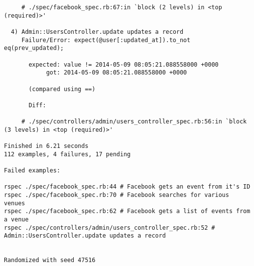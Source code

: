 \begin{lstlisting}
     # ./spec/facebook_spec.rb:67:in `block (2 levels) in <top (required)>'

  4) Admin::UsersController.update updates a record
     Failure/Error: expect(@user[:updated_at]).to_not eq(prev_updated);
       
       expected: value != 2014-05-09 08:05:21.088558000 +0000
            got: 2014-05-09 08:05:21.088558000 +0000
       
       (compared using ==)
       
       Diff:
       
     # ./spec/controllers/admin/users_controller_spec.rb:56:in `block (3 levels) in <top (required)>'

Finished in 6.21 seconds
112 examples, 4 failures, 17 pending

Failed examples:

rspec ./spec/facebook_spec.rb:44 # Facebook gets an event from it's ID
rspec ./spec/facebook_spec.rb:70 # Facebook searches for various venues
rspec ./spec/facebook_spec.rb:62 # Facebook gets a list of events from a venue
rspec ./spec/controllers/admin/users_controller_spec.rb:52 # Admin::UsersController.update updates a record


Randomized with seed 47516

\end{lstlisting}
